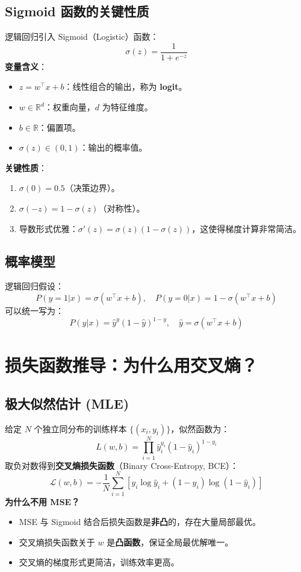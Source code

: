 \documentclass[12pt, a4paper]{book}
\begin{document}
\subsection{Sigmoid 函数的关键性质}
逻辑回归引入 Sigmoid（Logistic）函数：
$$ \sigma(z) = \frac{1}{1 + e^{-z}} $$
\textbf{变量含义}：
\begin{itemize}
    \item $z = w^\top x + b$：线性组合的输出，称为 \textbf{logit}。
    \item $w \in \mathbb{R}^d$：权重向量，$d$ 为特征维度。
    \item $b \in \mathbb{R}$：偏置项。
    \item $\sigma(z) \in (0, 1)$：输出的概率值。
\end{itemize}
\textbf{关键性质}：
\begin{enumerate}
    \item $\sigma(0) = 0.5$（决策边界）。
    \item $\sigma(-z) = 1 - \sigma(z)$（对称性）。
    \item 导数形式优雅：$\sigma'(z) = \sigma(z)(1 - \sigma(z))$，这使得梯度计算非常简洁。
\end{enumerate}

\subsection{概率模型}
逻辑回归假设：
$$ P(y=1|x) = \sigma(w^\top x + b), \quad P(y=0|x) = 1 - \sigma(w^\top x + b) $$
可以统一写为：
$$ P(y|x) = \hat{y}^y (1 - \hat{y})^{1-y}, \quad \hat{y} = \sigma(w^\top x + b) $$

\section{损失函数推导：为什么用交叉熵？}

\subsection{极大似然估计 (MLE)}
给定 $N$ 个独立同分布的训练样本 $\{(x_i, y_i)\}$，似然函数为：
$$ L(w, b) = \prod_{i=1}^N \hat{y}_i^{y_i} (1 - \hat{y}_i)^{1 - y_i} $$
取负对数得到\textbf{交叉熵损失函数}（Binary Cross-Entropy, BCE）：
$$ \mathcal{L}(w, b) = -\frac{1}{N} \sum_{i=1}^N \left[ y_i \log \hat{y}_i + (1 - y_i) \log(1 - \hat{y}_i) \right] $$
\textbf{为什么不用 MSE？}
\begin{itemize}
    \item MSE 与 Sigmoid 结合后损失函数是\textbf{非凸}的，存在大量局部最优。
    \item 交叉熵损失函数关于 $w$ 是\textbf{凸函数}，保证全局最优解唯一。
    \item 交叉熵的梯度形式更简洁，训练效率更高。
\end{itemize}
\end{document}
